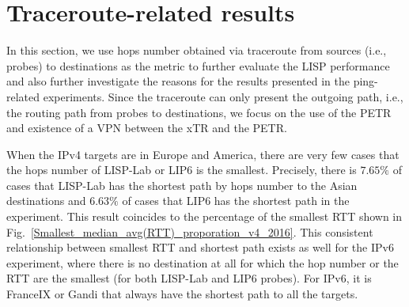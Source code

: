 \section{Traceroute-related results}
\label{sec:pxtr_traceroute} 
In this section, we use hops number obtained via traceroute from sources (i.e., probes) to destinations as the metric to further evaluate the LISP performance and also further investigate the reasons for the results presented in the ping-related experiments. Since the traceroute can only present the outgoing path, i.e., the routing path from probes to destinations, we focus on the use of the PETR and existence of a VPN between the xTR and the PETR.

When the IPv4 targets are in Europe and America, there are very few cases that the hops number of LISP-Lab or LIP6 is the smallest. Precisely, there is $7.65\%$ of cases that LISP-Lab has the shortest path by hops number to the Asian destinations and $6.63\%$ of cases that LIP6 has the shortest path in the experiment. This result coincides to the percentage of the smallest RTT shown in Fig.~\ref{Smallest_median_avg(RTT)_proporation_v4_2016}.
This consistent relationship between smallest RTT and shortest path exists as well for the IPv6 experiment, where there is no destination at all for which the hop number or the RTT are the smallest (for both LISP-Lab and LIP6 probes). For IPv6, it is FranceIX or Gandi that always have the shortest path to all the targets.

